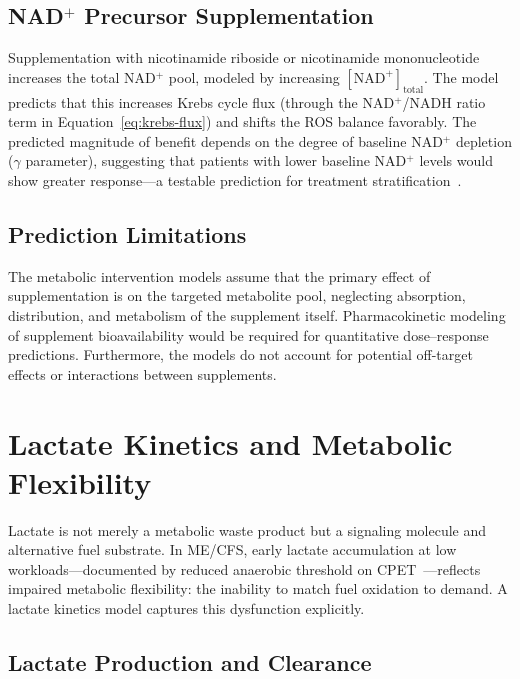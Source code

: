\subsection{NAD$^+$ Precursor Supplementation}

Supplementation with nicotinamide riboside or nicotinamide mononucleotide increases the total NAD$^+$ pool, modeled by increasing $[\text{NAD}^+]_{\text{total}}$. The model predicts that this increases Krebs cycle flux (through the NAD$^+$/NADH ratio term in Equation~\ref{eq:krebs-flux}) and shifts the ROS balance favorably. The predicted magnitude of benefit depends on the degree of baseline NAD$^+$ depletion ($\gamma$ parameter), suggesting that patients with lower baseline NAD$^+$ levels would show greater response---a testable prediction for treatment stratification~\cite{syed2025nad_therapy}.

\subsection{Prediction Limitations}

\begin{limitation}
The metabolic intervention models assume that the primary effect of supplementation is on the targeted metabolite pool, neglecting absorption, distribution, and metabolism of the supplement itself. Pharmacokinetic modeling of supplement bioavailability would be required for quantitative dose--response predictions. Furthermore, the models do not account for potential off-target effects or interactions between supplements.
\end{limitation}

\section{Lactate Kinetics and Metabolic Flexibility}
\label{sec:lactate-kinetics}

Lactate is not merely a metabolic waste product but a signaling molecule and alternative fuel substrate. In ME/CFS, early lactate accumulation at low workloads---documented by reduced anaerobic threshold on CPET~\cite{keller2024cpet}---reflects impaired metabolic flexibility: the inability to match fuel oxidation to demand. A lactate kinetics model captures this dysfunction explicitly.

\subsection{Lactate Production and Clearance}

